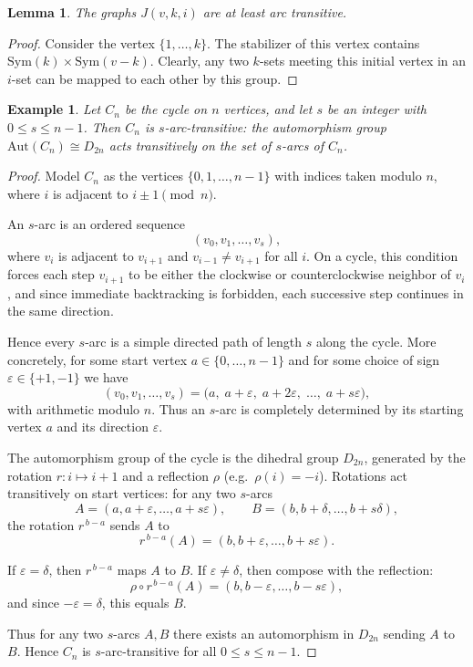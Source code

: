 \documentclass[12pt,a4paper,openany]{book}
\newtheorem{example}{Example}[section]
\newtheorem{lemma}{Lemma}[section]
\begin{document}
\begin{lemma}
The graphs $J(v, k, i)$ are at least arc transitive.
\end{lemma}

\begin{proof}
Consider the vertex $\{1, \ldots, k\}$. The stabilizer of this vertex contains $\mathrm{Sym}(k) \times \mathrm{Sym}(v - k)$. Clearly, any two $k$-sets meeting this initial vertex in an $i$-set can be mapped to each other by this group.
\end{proof}


\begin{example}
  
Let $C_n$ be the cycle on $n$ vertices, and let $s$ be an integer with $0 \leq s \leq n-1$. 
Then $C_n$ is $s$-arc-transitive: the automorphism group $\mathrm{Aut}(C_n)\cong D_{2n}$ 
acts transitively on the set of $s$-arcs of $C_n$.
\end{example}

\begin{proof}
Model $C_n$ as the vertices $\{0,1,\dots,n-1\}$ with indices taken modulo $n$, 
where $i$ is adjacent to $i\pm 1 \pmod n$. 

An $s$-arc is an ordered sequence
\[
(v_0,v_1,\dots,v_s),
\]
where $v_i$ is adjacent to $v_{i+1}$ and $v_{i-1}\neq v_{i+1}$ for all $i$. 
On a cycle, this condition forces each step $v_{i+1}$ to be either the clockwise or 
counterclockwise neighbor of $v_i$, and since immediate backtracking is forbidden, 
each successive step continues in the same direction. 

Hence every $s$-arc is a simple directed path of length $s$ along the cycle. 
More concretely, for some start vertex $a\in\{0,\dots,n-1\}$ and for some choice of 
sign $\varepsilon\in\{+1,-1\}$ we have
\[
(v_0,v_1,\dots,v_s)=
\bigl(a,\;a+\varepsilon,\;a+2\varepsilon,\;\dots,\;a+s\varepsilon\bigr),
\]
with arithmetic modulo $n$. Thus an $s$-arc is completely determined by its starting 
vertex $a$ and its direction $\varepsilon$.

The automorphism group of the cycle is the dihedral group $D_{2n}$, generated by 
the rotation $r\colon i\mapsto i+1$ and a reflection $\rho$ (e.g.\ $\rho(i)=-i$). 
Rotations act transitively on start vertices: for any two $s$-arcs
\[
A=(a,a+\varepsilon,\dots,a+s\varepsilon),\qquad
B=(b,b+\delta,\dots,b+s\delta),
\]
the rotation $r^{\,b-a}$ sends $A$ to 
\[
r^{\,b-a}(A)=(b,b+\varepsilon,\dots,b+s\varepsilon).
\]

If $\varepsilon=\delta$, then $r^{\,b-a}$ maps $A$ to $B$. 
If $\varepsilon\neq \delta$, then compose with the reflection: 
\[
\rho\circ r^{\,b-a}(A)=(b,b-\varepsilon,\dots,b-s\varepsilon),
\]
and since $-\varepsilon=\delta$, this equals $B$.

Thus for any two $s$-arcs $A,B$ there exists an automorphism in $D_{2n}$ 
sending $A$ to $B$. Hence $C_n$ is $s$-arc-transitive for all $0\le s\le n-1$.
\end{proof}
\end{document}
